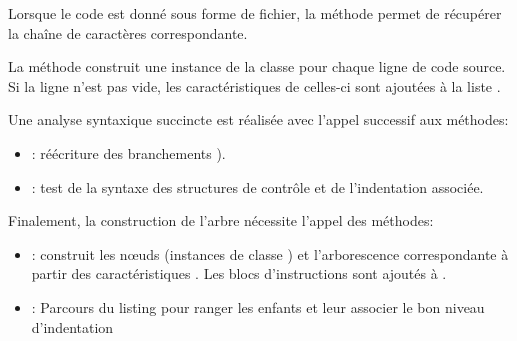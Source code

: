 Lorsque le code est donné sous forme de fichier, la méthode  permet de récupérer la chaîne de caractères correspondante.

La méthode  construit une instance de la classe  pour chaque ligne de code source. Si la ligne n'est pas vide, les caractéristiques de celles-ci sont ajoutées à la liste .

Une analyse syntaxique succincte est réalisée avec l'appel successif aux méthodes:
\begin{itemize}
	\item  {}: réécriture des branchements ).
\begin{center}

		
	\end{center}
	\item {}: test de la syntaxe des structures de contrôle et de l'indentation associée.
\end{itemize}


Finalement, la construction de l'arbre  nécessite l'appel des méthodes:
\begin{itemize}
	\item {}: construit les n\oe uds (instances de classe ) et l'arborescence correspondante à partir des caractéristiques . Les blocs d'instructions sont ajoutés à .
	
	\item {}: Parcours du listing  pour ranger les enfants et leur associer le bon niveau d'indentation
\end{itemize} 


